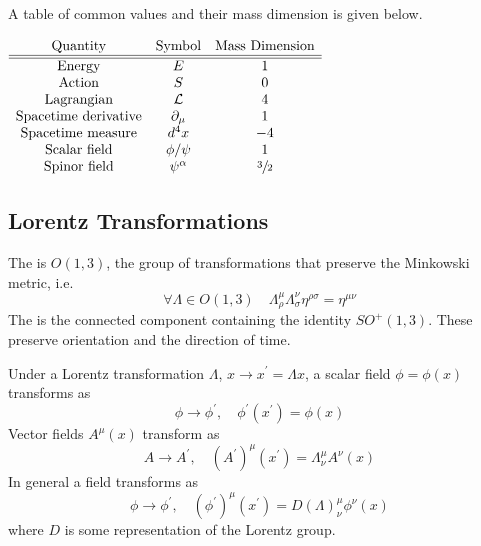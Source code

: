 \documentclass{article}
\begin{document}
\begin{fact}
A table of common values and their mass dimension is given below. 
\begin{center}$
\begin{array}{ccc}
    \text{Quantity} & \text{Symbol} & \text{Mass Dimension} \\
    \hline
    \hline
    \text{Energy} & E & 1 \\
    \text{Action} & S & 0 \\
    \text{Lagrangian} & \mathcal{L} & 4 \\
    \text{Spacetime derivative} & \partial_\mu & 1 \\
    \text{Spacetime measure} & d^4x & -4 \\
    \text{Scalar field} & \phi/\psi & 1 \\
    \text{Spinor field} & \psi^\alpha & \sfrac{3}{2} \\ 
\end{array}
$\end{center}
\end{fact}

\subsection{Lorentz Transformations}

\begin{definition}
The  is $O(1,3)$, the group of transformations that preserve the Minkowski metric, i.e.
\[
\forall \Lambda\in O(1,3) \quad \Lambda^\mu_\rho \Lambda^\nu_\sigma \eta^{\rho\sigma}=\eta^{\mu\nu}
\]
The  is the connected component containing the identity $SO^+(1,3)$. These preserve orientation and the direction of time. 
\end{definition}

\begin{theorem}
Under a Lorentz transformation $\Lambda$, $x\to x^\prime=\Lambda x$, a scalar field $\phi=\phi(x)$ transforms as 
\[
\phi\to\phi^\prime, \quad \phi^\prime(x^\prime)=\phi(x)
\]
Vector fields $A^\mu(x)$ transform as 
\[
A\to A^\prime, \quad \left(A^\prime\right)^\mu(x^\prime)=\Lambda^\mu_\nu A^\nu (x)
\]
In general a field transforms as 
\[
\phi\to\phi^\prime, \quad (\phi^\prime)^\mu(x^\prime)=D(\Lambda)^\mu_\nu \phi^\nu(x)
\]
where $D$ is some representation of the Lorentz group. 
\end{theorem}
\end{document}
